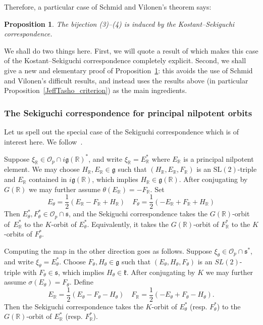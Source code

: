 \documentclass[10pt,leqno]{article}
\newtheorem{proposition}[equation]{Proposition}
\numberwithin{equation}{section}
\renewcommand{\O}{\mathcal O}
\newcommand{\R}{\mathbb R}
\renewcommand{\k}{\mathfrak k}
\newcommand{\g}{\mathfrak g}
\newcommand{\s}{\mathfrak s}
\newcommand{\Op}{\O_p}
\begin{document}
Therefore, a particular case of Schmid and Vilonen's theorem says: 
\begin{proposition} \label{Sekiguchi_result} The bijection (3)--(4) is induced by the Kostant--Sekiguchi correspondence.
\end{proposition} 
We shall do two things here. First, we will quote a result of \cite{AVAV} which makes this case of the Kostant--Sekiguchi correspondence completely explicit. Second, we shall give a new and elementary proof of Proposition~\ref{Sekiguchi_result}: this avoids the use of Schmid and Vilonen's difficult results, and instead uses the results above (in particular Proposition~\ref{JeffTasho_criterion}) as the main ingredients. 


\subsubsection{The Sekiguchi correspondence for principal nilpotent orbits}\label{sec:concrete_sek}
Let us spell out the special case of the Sekiguchi correspondence which is of interest here. We follow~\cite[Section~2]{AVAV}.


Suppose $\xi_\R\in \Op\cap i\g(\R)^\ast$, and write $\xi_\R = E_\R^\ast$ where $E_\R$ is a principal nilpotent element. We may choose $H_\R, E_\R \in \g$ such that $(H_\R,E_\R,F_\R)$ is an $\mathrm{SL}(2)$-triple and  $E_\R$  contained in $i\g(\R)$,
which implies $H_\R\in \g(\R)$. 
After conjugating by~$G(\R)$ we may further assume $\theta(E_\R)=-F_\R$. Set 
\[   E_\theta=\frac12(E_\R-F_\R+H_\R)\quad
F_\theta=\frac12(-E_\R+F_\R+H_\R)
\]
Then $E^\ast_\theta,F^\ast_\theta\in \Op\cap \s$, and the Sekiguchi correspondence takes the $G(\R)$-orbit of~$E^*_\R$ to the $K$-orbit of $E_\theta^\ast$. 
Equivalently, it takes the $G(\R)$-orbit of $F^*_\R$ to the $K$-orbits of $F_\theta^\ast$.

Computing the map in the other direction goes as follows.
Suppose $\xi_\theta \in \Op\cap \s^\ast$, and write $\xi_\theta=E_\theta^\ast$. Choose $F_\theta, H_\theta \in \g$ such that $(E_\theta, H_\theta, F_\theta)$ is an $SL(2)$-triple with $F_\theta \in \s$,  which implies $H_\theta\in\k$. After conjugating by $K$ we may further assume $\sigma(E_\theta)=F_\theta$.
Define 
\begin{equation}\label{def_F_R}
E_\R=\frac12(E_\theta-F_\theta-H_\theta)\quad
F_\R=\frac12(-E_\theta+F_\theta-H_\theta).
\end{equation}
Then the Sekiguchi correspondence takes the $K$-orbit of $E^*_\theta$ (resp. $F^*_\theta$) to the $G(\R)$-orbit of $E_\R^\ast$ (resp. $F_\R^\ast$).
\end{document}

